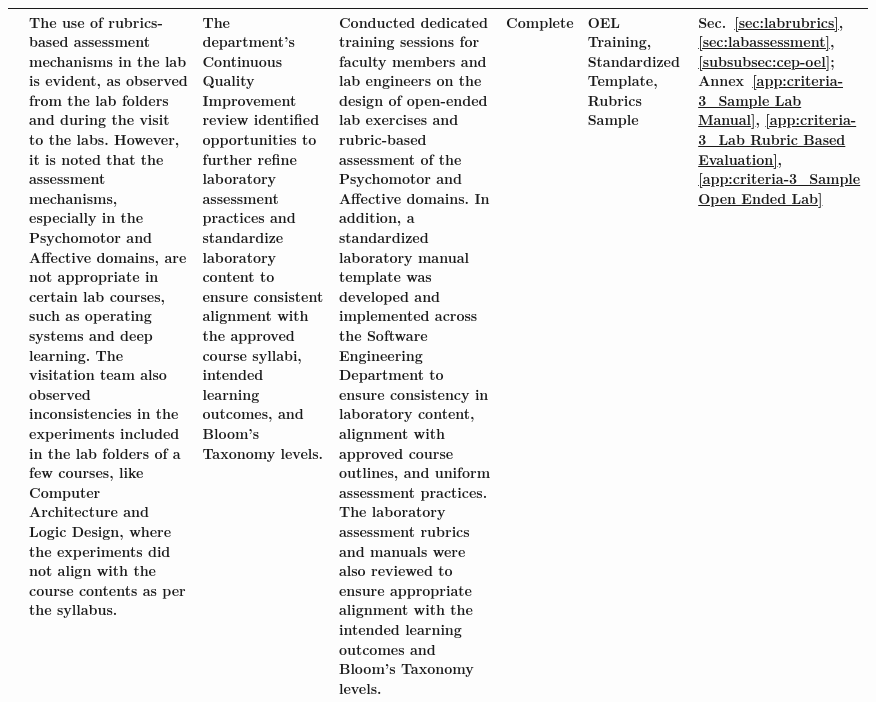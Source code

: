 \begin{landscape}
\begin{longtable}{|P{2.3cm}|P{5.0cm}|P{4.5cm}|P{5.0cm}|P{2.4cm}|P{2.8cm}|P{1.8cm}|}
 & The use of rubrics-based assessment mechanisms in the lab is evident, as observed from the lab folders and during the visit to the labs. However, it is noted that the assessment mechanisms, especially in the Psychomotor and Affective domains, are not appropriate in certain lab courses, such as operating systems and deep learning. The visitation team also observed inconsistencies in the experiments included in the lab folders of a few courses, like Computer Architecture and Logic Design, where the experiments did not align with the course contents as per the syllabus. & The department's Continuous Quality Improvement review identified opportunities to further refine laboratory assessment practices and standardize laboratory content to ensure consistent alignment with the approved course syllabi, intended learning outcomes, and Bloom's Taxonomy levels. & Conducted dedicated training sessions for faculty members and lab engineers on the design of open-ended lab exercises and rubric-based assessment of the Psychomotor and Affective domains. In addition, a standardized laboratory manual template was developed and implemented across the Software Engineering Department to ensure consistency in laboratory content, alignment with approved course outlines, and uniform assessment practices. The laboratory assessment rubrics and manuals were also reviewed to ensure appropriate alignment with the intended learning outcomes and Bloom's Taxonomy levels. & Complete & OEL Training, Standardized Template, Rubrics Sample & Sec.~\ref{sec:labrubrics}, \ref{sec:labassessment}, \ref{subsubsec:cep-oel}; Annex~\ref{app:criteria-3_Sample Lab Manual}, \ref{app:criteria-3_Lab Rubric Based Evaluation}, \ref{app:criteria-3_Sample Open Ended Lab} \\ \hline

\end{longtable}
\end{landscape}
